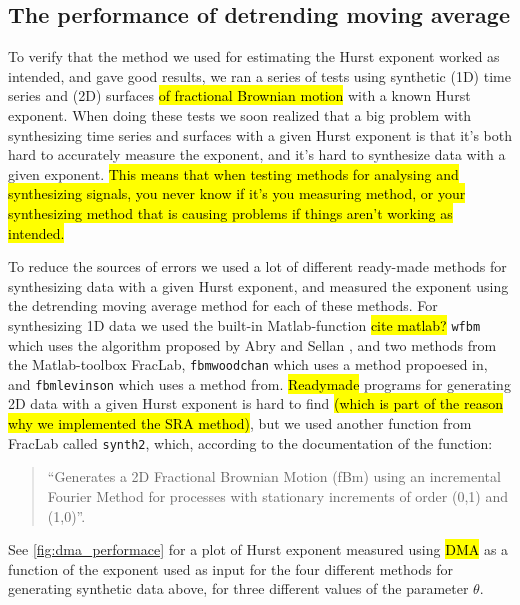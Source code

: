 
\subsection{The performance of detrending moving average}
To verify that the method we used for estimating the Hurst exponent worked as intended, and gave good results, we ran a series of tests using synthetic (1D) time series and (2D) surfaces \hl{of fractional Brownian motion} with a known Hurst exponent. When doing these tests we soon realized that a big problem with synthesizing time series and surfaces with a given Hurst exponent is that it's both hard to accurately measure the exponent, and it's hard to synthesize data with a given exponent. \hl{This means that when testing methods for analysing and synthesizing signals, you never know if it's you measuring method, or your synthesizing method that is causing problems if things aren't working as intended.}

To reduce the sources of errors we used a lot of different ready-made methods for synthesizing data with a given Hurst exponent, and measured the exponent using the detrending moving average method for each of these methods. For synthesizing 1D data we used the built-in Matlab-function \hl{cite matlab?} \Verb!wfbm! which uses the algorithm proposed by Abry and Sellan \cite{abry1996wavelet}, and two methods from the Matlab-toolbox FracLab\cite{fraclab_toolbox}, \Verb!fbmwoodchan! which uses a method propoesed in\cite{wood1994simulation}, and \Verb!fbmlevinson! which uses a method from\cite{levinson1947wiener}. \hl{Readymade} programs for generating 2D data with a given Hurst exponent is hard to find \hl{(which is part of the reason why we implemented the SRA method)}, but we used another function from FracLab called \Verb!synth2!, which, according to the documentation of the function:%
\begin{quote}
    ``Generates a 2D Fractional Brownian Motion (fBm) using an incremental Fourier Method for processes with stationary increments of order (0,1) and (1,0)''.
\end{quote}

See \cref{fig:dma_performace} for a plot of Hurst exponent measured using \hl{DMA} as a function of the exponent used as input for the four different methods for generating synthetic data above, for three different values of the parameter $\theta$.

